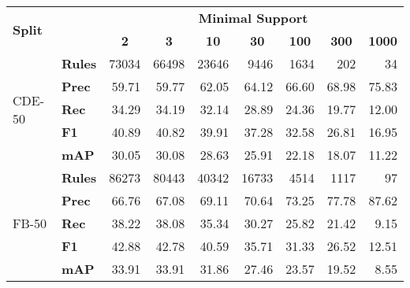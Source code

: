 \begin{tabular}{| l | l | r | r | r | r | r | r | r |}
    \hline

    \multirow{2}{*}{\textbf{Split}} &
    &
    \multicolumn{7}{|c|}{\textbf{Minimal Support}} \\

    &
    &
    \multicolumn{1}{|c|}{\textbf{2}} &
    \multicolumn{1}{|c|}{\textbf{3}} &
    \multicolumn{1}{|c|}{\textbf{10}} &
    \multicolumn{1}{|c|}{\textbf{30}} &
    \multicolumn{1}{|c|}{\textbf{100}} &
    \multicolumn{1}{|c|}{\textbf{300}} &
    \multicolumn{1}{|c|}{\textbf{1000}} \\

    \hline \hline

    \multirow{5}{*}{CDE-50}
    & \textbf{Rules} & \num{73034} & \num{66498} & \num{23646}  & \num{9446}  & \num{1634} & \num{202} & \num{34}   \\ \cline{2-9}
    & \textbf{Prec}  & 59.71       & 59.77       & 62.05       & 64.12       & 66.60      & 68.98      & 75.83      \\
    & \textbf{Rec}   & 34.29       & 34.19       & 32.14       & 28.89       & 24.36      & 19.77      & 12.00      \\
    & \textbf{F1}    & 40.89       & 40.82       & 39.91       & 37.28       & 32.58      & 26.81      & 16.95      \\
    & \textbf{mAP}   & 30.05       & 30.08       & 28.63       & 25.91       & 22.18      & 18.07      & 11.22      \\ \hline \hline

    \multirow{5}{*}{FB-50}
    & \textbf{Rules} & \num{86273} & \num{80443} & \num{40342} & \num{16733} & \num{4514} & \num{1117} & \num{97}   \\ \cline{2-9}
    & \textbf{Prec}  & 66.76       & 67.08       & 69.11       & 70.64       & 73.25      & 77.78      & 87.62      \\
    & \textbf{Rec}   & 38.22       & 38.08       & 35.34       & 30.27       & 25.82      & 21.42      & 9.15       \\
    & \textbf{F1}    & 42.88       & 42.78       & 40.59       & 35.71       & 31.33      & 26.52      & 12.51      \\
    & \textbf{mAP}   & 33.91       & 33.91       & 31.86       & 27.46       & 23.57      & 19.52      & 8.55       \\ \hline

\end{tabular}
